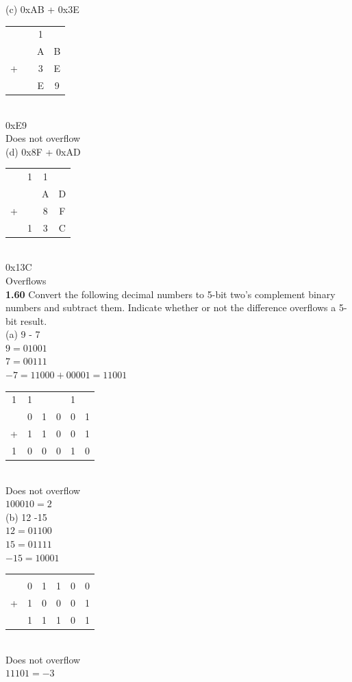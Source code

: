 \documentclass[12pt,a4paper]{report}
\begin{document}
\begin{normalsize}
(c) 0xAB + 0x3E \\
\begin{tabular}{c@{\,}c@{\,}c@{\,}c}
  & & 1 &     \\
  & & A & B \\
+ & & 3 & E \\
\hline
  & & E & 9 \\
\end{tabular} \\
0xE9 \\
Does not overflow \\

(d) 0x8F + 0xAD \\
\begin{tabular}{c@{\,}c@{\,}c@{\,}c}
  & 1 & 1 &     \\
  &  & A & D \\
+ &  & 8 & F \\
\hline
  & 1 & 3 & C \\
\end{tabular} \\
0x13C \\
Overflows \\

\textbf{1.60} Convert the following decimal numbers to 5-bit two's complement binary numbers and subtract them. Indicate whether or not the difference overflows a 5-bit result. \\
(a) 9 - 7 \\
$ 9 = 01001 $ \\
$ 7 = 00111 $ \\
$ -7 = 11000 + 00001 = 11001 $ \\
\begin{tabular}{c@{\,}c@{\,}c@{\,}c@{\,}c@{\,}c}
1 & 1 &   &   & 1 & \\
  & 0 & 1 & 0 & 0 & 1 \\
+ & 1 & 1 & 0 & 0 & 1 \\
\hline
1 & 0 & 0 & 0 & 1 & 0 \\
\end{tabular} \\
Does not overflow \\
$ 100010 = 2 $ \\

(b) 12 -15 \\
$ 12 = 01100 $ \\
$ 15 = 01111 $ \\
$ -15 = 10001 $ \\
\begin{tabular}{c@{\,}c@{\,}c@{\,}c@{\,}c@{\,}c}
  &   &   &   &   & \\
  & 0 & 1 & 1 & 0 & 0 \\
+ & 1 & 0 & 0 & 0 & 1 \\
\hline
  & 1 & 1 & 1 & 0 & 1 \\
\end{tabular} \\
Does not overflow \\
$ 11101 = -3 $ \\


\end{normalsize}
\end{document}
